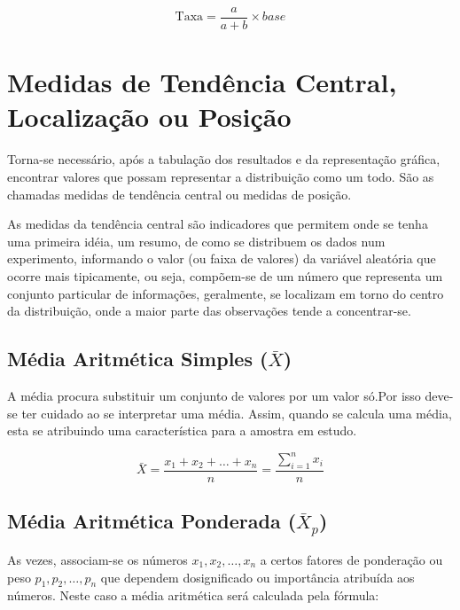 $$ \mbox{Taxa} = \frac{a}{a+b} \times base$$



\section{Medidas de Tendência Central, Localização ou Posição}

Torna-se necessário, após a tabulação dos resultados e da representação gráfica, encontrar valores que possam representar a distribuição como um todo. São as chamadas medidas de tendência central ou medidas de posição.\vskip0.3cm

As medidas da tendência central são indicadores que permitem onde se tenha uma primeira idéia, um resumo, de como se distribuem os dados num experimento, informando o valor (ou faixa de valores) da variável aleatória que ocorre mais tipicamente, ou seja, compõem-se de um número que representa um conjunto particular de informações, geralmente, se localizam em torno do centro da distribuição, onde a maior parte das observações tende a concentrar-se.





\subsection{Média Aritmética Simples ($\bar{X}$)}

A média procura substituir um conjunto de valores por um valor só.Por isso
deve-se ter cuidado ao se interpretar uma média. Assim, quando se calcula uma média, esta se atribuindo
uma característica para a amostra em estudo.



\begin{equation}\label{media}
     \bar{X}=\frac{x_{1}+x_{2}+\ldots+x_{n}}{n}=\frac{\sum_{i=1}^{n}x_{i}}{n}
\end{equation}




\subsection{Média Aritmética Ponderada ($\bar{X}_{p}$)}

As vezes, associam-se os números $x_{1},x_{2},\ldots,x_{n}$ a certos fatores de ponderação ou peso $p_{1},p_{2},\ldots,p_{n}$ que dependem dosignificado ou importância atribuída aos números. Neste caso
 a média aritmética será calculada pela fórmula:

